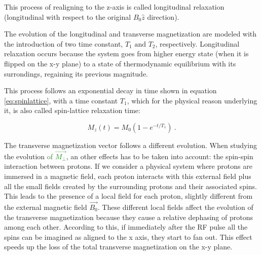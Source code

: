 \documentclass[11pt]{report}
\begin{document}
This process of realigning to the z-axis is called longitudinal relaxation (longitudinal with respect to the original $B_0 \hat z$ direction).

The evolution of the longitudinal and transverse magnetization are modeled with the introduction of two time constant, $T_1 \text{ and } T_2$, respectively.
Longitudinal relaxation occurs because the system goes from higher energy state (when it is flipped on the x-y plane) to a state of thermodynamic equilibrium with its surrondings, regaining its previous magnitude.

This process follows an exponential decay in time shown in equation \ref{eq:spinlattice}, with a time constant $T_1$, which for the physical reason underlying it, is also called spin-lattice relaxation time:

\begin{equation}\label{eq:spinlattice}
M_z(t) = M_0 (1-e^{-t/T_1}) \ .
\end{equation}


The transverse magnetization vector follows a different evolution.
When studying the evolution \textcolor{ForestGreen}{of $\vec{M_\perp}$}, an other effects has to be taken into account: the spin-spin interaction between protons.
If we consider a physical system where protons are immersed in a magnetic field, each proton interacts with this external field plus all the small fields created by the surrounding protons and their associated spins. This leads to the presence of a local field for each proton, slightly different from the external magnetic field $\vec{B_0}$.
These different local fields affect the evolution of the transverse magnetization because they cause a relative dephasing of protons among each other.
According to this, if immediately after the RF pulse all the spins can be imagined as aligned to the x axis, they start to fan out.
This effect speeds up the loss of the total transverse magnetization on the x-y plane.
\end{document}
